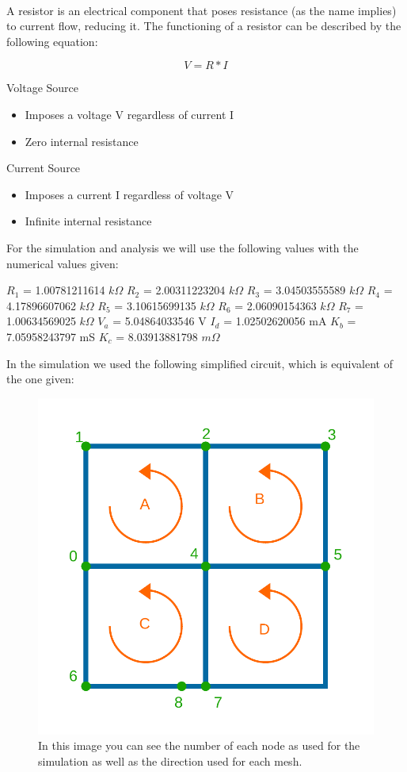 \paragraph{}A resistor is an electrical component that poses resistance (as the name implies) to current flow, reducing it. The functioning of a resistor can be described
 by the following equation:

\begin{equation}
	V = R * I
	\label{eq:kvl}
\end{equation}

Voltage Source

\begin{itemize}
	\item Imposes a voltage V regardless of current I
	\item Zero internal resistance
\end{itemize}

Current Source

\begin{itemize}
	\item Imposes a current I regardless of voltage V
	\item Infinite internal resistance
\end{itemize}

For the simulation and analysis we will use the following values with the numerical values given:

$R_1$ = 1.00781211614 $k\Omega$
$R_2$ = 2.00311223204 $k\Omega$
$R_3$ = 3.04503555589 $k\Omega$
$R_4$ = 4.17896607062 $k\Omega$
$R_5$ = 3.10615699135 $k\Omega$
$R_6$ = 2.06090154363 $k\Omega$
$R_7$ = 1.00634569025 $k\Omega$
$V_a$ = 5.04864033546 V
$I_d$ = 1.02502620056 mA
$K_b$ = 7.05958243797 mS
$K_c$ = 8.03913881798 $m\Omega$

In the simulation we used the following simplified circuit, which is equivalent of the one given:

\begin{figure}[h] \centering
	\includegraphics[width=0.4\linewidth]{sim.pdf}
	\caption{In this image you can see the number of each node as used for the simulation as well as the direction used for each mesh.}
	\label{fig:sim}
\end{figure}

